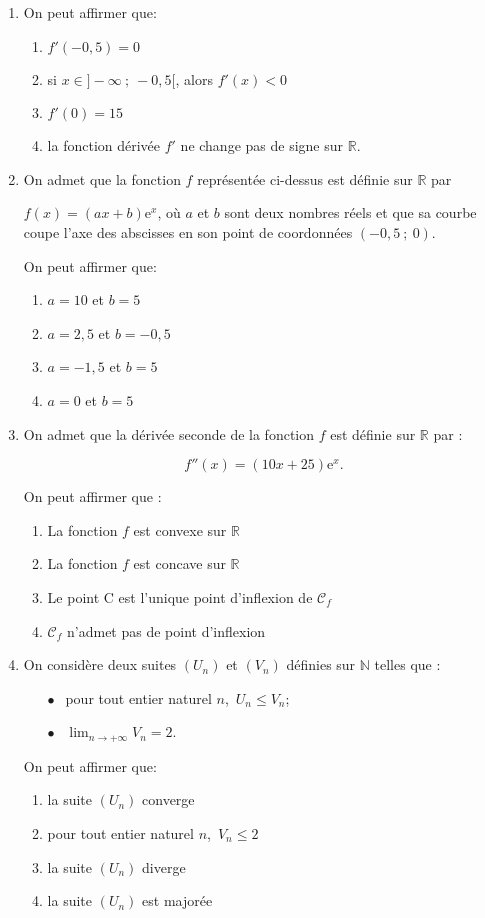 \documentclass[11pt]{article}
\newcommand{\R}{\mathbb{R}}
\newcommand{\N}{\mathbb{N}}
\begin{document}
\begin{enumerate}
\item On peut affirmer que:
	\begin{enumerate}
		\item $f'(-0,5) = 0$
		\item si $x \in ]- \infty~;~-0,5[$, alors $f'(x) < 0$
		\item $f'(0) = 15$
		\item la fonction dérivée $f'$ ne change pas de
signe sur $\R$.
	\end{enumerate}
\item On admet que la fonction $f$ représentée ci-dessus est définie sur $\R$ par 

$f(x) = (ax + b)\text{e}^x$, où $a$ et $b$ sont deux nombres réels et que sa courbe coupe l'axe des abscisses en son point de coordonnées $(-0,5~;~ 0)$.

On peut affirmer que:
	\begin{enumerate}
		\item $a = 10$ et $b = 5$ 
		\item $a = 2,5$ et $b = -0,5$ 
		\item $a = -1,5$ et $b = 5$ 
		\item $a = 0$ et $b = 5$
	\end{enumerate}
\item On admet que la dérivée seconde de la fonction $f$ est définie sur $\R$ par : 

\[f''(x) = (10x + 25)\text{e}^x.\]

On peut affirmer que :
	\begin{enumerate}
		\item La fonction $f$ est convexe sur $\R$
		\item La fonction $f$ est concave sur $\R$
		\item Le point C est l'unique point d'inflexion de $\mathcal{C}_f$
		\item $\mathcal{C}_f$ n'admet pas de point d'inflexion
	\end{enumerate}
\item On considère deux suites $\left(U_n\right)$ et  $\left(V_n\right)$ définies sur $\N$ telles que : 

\setlength\parindent{1cm}
\begin{itemize}
\item[$\bullet~~$] pour tout entier naturel $n$,\, $U_n \leqslant V_n$;
\item[$\bullet~~$] $\displaystyle\lim_{n \to+ \infty}  V_n= 2$.
\end{itemize}
\setlength\parindent{0cm}

On peut affirmer que:

	\begin{enumerate}
		\item la suite $\left(U_n\right)$ converge 
		\item pour tout entier naturel $n$,\, $V_n \leqslant 2$		
		\item la suite $\left(U_n\right)$ diverge
		\item la suite $\left(U_n\right)$ est majorée
	\end{enumerate} 
\end{enumerate}
\end{document}
